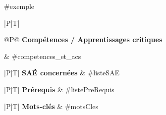 #exemple

\begin{tabular}[t]{|P|T|}
\hline
    \begin{tabular}[t]{@{}P@{}}
        \bfseries \textcolor{ressourceC}{Compétences /} \tabularnewline
        \bfseries \textcolor{ressourceC}{Apprentissages} \tabularnewline
        \bfseries \textcolor{ressourceC}{critiques}
    \end{tabular}
    &
    #competences_et_acs \\
\hline
\end{tabular}

\begin{tabular}[t]{|P|T|}
\hline
    \textcolor{ressourceC}{\bfseries SAÉ concernées }
    &
    #listeSAE %
    \\
\hline
\end{tabular}

\begin{tabular}[t]{|P|T|}
\hline
    \textcolor{ressourceC}{\bfseries Prérequis}
    &
    #listePreRequis %
    \\
\hline
\end{tabular}

\begin{tabular}[t]{|P|T|}
\hline
    \textcolor{ressourceC}{\bfseries Mots-clés}
    &
    #motsCles %
    \\
\hline

\end{tabular}

